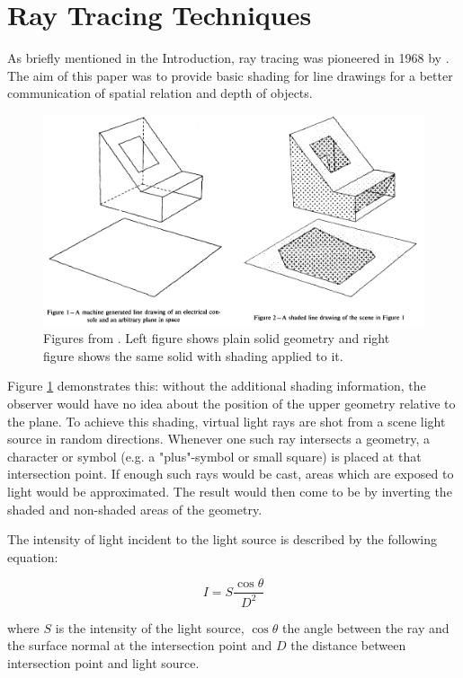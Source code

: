 \section{Ray Tracing Techniques}
As briefly mentioned in the Introduction, ray tracing was pioneered in 1968 by \cite{appel1968some}. The aim of this paper was to provide basic shading for line drawings for a better communication of spatial relation and depth of objects.

\begin{figure}[h]
	\centering
	\includegraphics[width=1\linewidth]{img/1 fundamentals/appel_comp}
	\caption{Figures from \cite{appel1968some}. Left figure shows plain solid geometry and right figure shows the same solid with shading applied to it.}
	\label{fig:appel}
\end{figure}

Figure \ref{fig:appel} demonstrates this: without the additional shading information, the observer would have no idea about the position of the upper geometry relative to the plane.
To achieve this shading, virtual light rays are shot from a scene light source in random directions. Whenever one such ray intersects a geometry, a character or symbol (e.g. a "plus"-symbol or small square) is placed at that intersection point. If enough such rays would be cast, areas which are exposed to light would be approximated. The result would then come to be by inverting the shaded and non-shaded areas of the geometry.

The intensity of light incident to the light source is described by the following equation:

\begin{equation}
I = S\frac{\cos{\theta}}{{D}^2}
\end{equation}

where $S$ is the intensity of the light source, $\cos{\theta}$ the angle between the ray and the surface normal at the intersection point and $D$ the distance between intersection point and light source.

